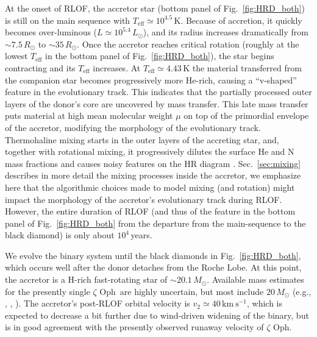 \documentclass[twocolumn,twocolappendix,trackchanges]{aastex63}
\newcommand{\kms}{{\mathrm{km\ s^{-1}}}}
\DeclareRobustCommand{\Figref}[1]{Fig.~\ref{#1}}
\DeclareRobustCommand{\Secref}[1]{Sec.~\ref{#1}}
\newcommand{\zoph}{$\zeta$ Oph}
\begin{document}
At the onset of RLOF, the accretor star (bottom panel of
\Figref{fig:HRD_both}) is still on the main sequence with
$T_\mathrm{eff}\simeq10^{4.5}$\,K. Because of accretion,
it quickly becomes over-luminous ($L\simeq10^{5.4}\,L_\odot$), and its
radius increases dramatically from $\sim7.5\,R_\odot$ to
$\sim35\,R_\odot$. Once the accretor reaches critical rotation
(roughly at the lowest $T_\mathrm{eff}$ in the bottom panel of
\Figref{fig:HRD_both}), the star begins contracting and its
$T_\mathrm{eff}$ increases. At $T_\mathrm{eff}\simeq 4.{43}$\,K the
material transferred from the companion star becomes progressively
more He-rich, causing a ``v-shaped'' feature in the evolutionary
track. This indicates that the partially processed outer layers of the donor's core are
uncovered by mass transfer. %
This late mass transfer puts material at high mean molecular weight
$\mu$ on top of the primordial envelope of the accretor, modifying the morphology of the evolutionary track. Thermohaline mixing starts in the outer layers of the accreting star, and, together with rotational mixing, it progressively dilutes the surface He and N mass fractions and causes noisy features on the HR diagram \citep[e.g.,][]{cantiello:07}. \Secref{sec:mixing} describes in more detail the mixing processes inside the accretor, we emphasize here that the algorithmic choices made to model mixing (and rotation) might impact the morphology of the accretor's evolutionary track during RLOF. However, the entire duration of RLOF (and thus of the feature in the bottom panel of \Figref{fig:HRD_both} from the departure from the main-sequence to the black diamond) is only about
$10^4$\,years.

We evolve the binary system until the black diamonds in
\Figref{fig:HRD_both}, which occurs well after the donor detaches from
the Roche Lobe. At this point, the accretor is a H-rich fast-rotating
star of
$\sim$$20.1\,M_\odot$. Available mass estimates for the presently single \zoph\ are highly uncertain, but most include
$20\,M_\odot$ (e.g., \citealt{hoogerwerf:01}, , \citealt{neuhauser:20}). The accretor's post-RLOF orbital velocity is
$v_2\simeq40\,\kms$, which is expected to decrease a bit further due to wind-driven widening of the binary, but is in good agreement with the presently observed runaway velocity of \zoph.
\end{document}
